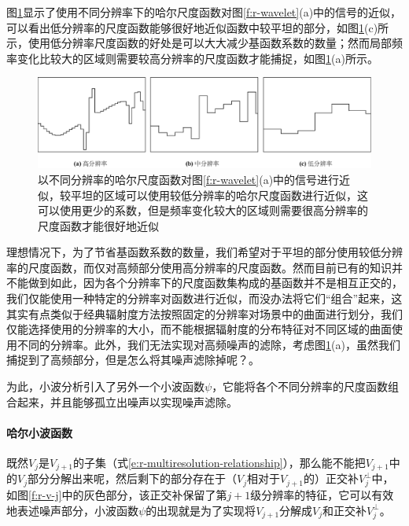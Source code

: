 图\ref{f:r-scalings}显示了使用不同分辨率下的哈尔尺度函数对图\ref{f:r-wavelet}(a)中的信号的近似，可以看出低分辨率的尺度函数能够很好地近似函数中较平坦的部分，如图\ref{f:r-scalings}(c)所示，使用低分辨率尺度函数的好处是可以大大减少基函数系数的数量；然而局部频率变化比较大的区域则需要较高分辨率的尺度函数才能捕捉，如图\ref{f:r-scalings}(a)所示。

\begin{figure}
	\begin{fullwidth}
		\includegraphics[width=1.0\thewidth]{figures/r/scalings}
		\caption{以不同分辨率的哈尔尺度函数对图\ref{f:r-wavelet}(a)中的信号进行近似，较平坦的区域可以使用较低分辨率的哈尔尺度函数进行近似，这可以使用更少的系数，但是频率变化较大的区域则需要很高分辨率的尺度函数才能很好地近似}
		\label{f:r-scalings}
	\end{fullwidth}
\end{figure}

理想情况下，为了节省基函数系数的数量，我们希望对于平坦的部分使用较低分辨率的尺度函数，而仅对高频部分使用高分辨率的尺度函数。然而目前已有的知识并不能做到如此，因为各个分辨率下的尺度函数集构成的基函数并不是相互正交的，我们仅能使用一种特定的分辨率对函数进行近似，而没办法将它们“组合”起来，这其实有点类似于经典辐射度方法按照固定的分辨率对场景中的曲面进行划分，我们仅能选择使用的分辨率的大小，而不能根据辐射度的分布特征对不同区域的曲面使用不同的分辨率。此外，我们无法实现对高频噪声的滤除，考虑图\ref{f:r-scalings}(a)，虽然我们捕捉到了高频部分，但是怎么将其噪声滤除掉呢？。

为此，小波分析引入了另外一个小波函数$\psi$，它能将各个不同分辨率的尺度函数组合起来，并且能够孤立出噪声以实现噪声滤除。




\paragraph{哈尔小波函数}
既然$V_j$是$V_{j+1}$的子集（式\ref{e:r-multiresolution-relationship}），那么能不能把$V_{j+1}$中的$V_j$部分分解出来呢，然后剩下的部分存在于（$V_j$相对于$V_{j+1}$的）正交补$V^{\perp}_j$中，如图\ref{f:r-v-j}中的灰色部分，该正交补保留了第$j+1$级分辨率的特征，它可以有效地表述噪声部分，小波函数$\psi$的出现就是为了实现将$V_{j+1}$分解成$V_j$和正交补$V^{\perp}_j$。

